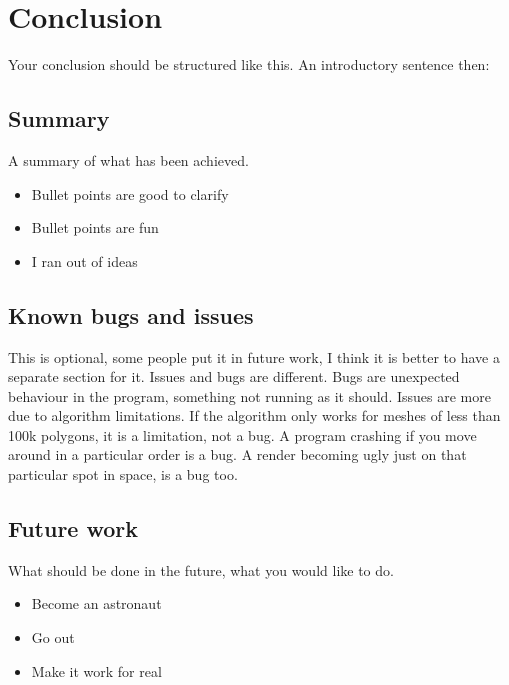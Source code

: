 
\ifx\isEmbedded\undefined

\graphicspath{{../img/}}

\fi

\chapter{Conclusion}
\label{chap:conclusion}

Your conclusion should be structured like this. An introductory sentence then:

\section{Summary}

A summary of what has been achieved.

\begin{itemize}
\item Bullet points are good to clarify
\item Bullet points are fun
\item I ran out of ideas
\end{itemize}

\section{Known bugs and issues}

This is optional, some people put it in future work, I think it is better to have a separate section for it. Issues and bugs are different. Bugs are unexpected behaviour in the program, something not running as it should. Issues are more due to algorithm limitations. If the algorithm only works for meshes of less than 100k polygons, it is a limitation, not a bug. A program crashing if you move around in a particular order is a bug. A render becoming ugly just on that particular spot in space, is a bug too.

\section{Future work}

What should be done in the future, what you would like to do.

\begin{itemize}
\item Become an astronaut
\item Go out
\item Make it work for real
\end{itemize}


\ifx\isEmbedded\undefined


\pagebreak

\fi